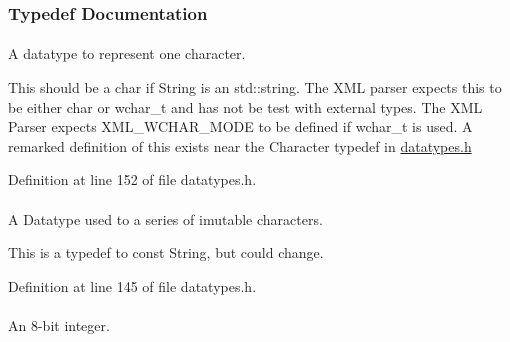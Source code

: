 \subsubsection{Typedef Documentation}
\hypertarget{namespaceMezzanine_ad5147a419db7627ee552a2b582f1052d}{
\paragraph[{Character}]{}\hfill}
\label{namespaceMezzanine_ad5147a419db7627ee552a2b582f1052d}


A datatype to represent one character. 

This should be a char if String is an std::string. The XML parser expects this to be either char or wchar\_\-t and has not be test with external types. The XML Parser expects XML\_\-WCHAR\_\-MODE to be defined if wchar\_\-t is used. A remarked definition of this exists near the Character typedef in \hyperlink{datatypes_8h_source}{datatypes.h} 

Definition at line 152 of file datatypes.h.

\hypertarget{namespaceMezzanine_a63cd699ac54b73953f35ec9cfc05e506}{
\paragraph[{ConstString}]{}\hfill}
\label{namespaceMezzanine_a63cd699ac54b73953f35ec9cfc05e506}


A Datatype used to a series of imutable characters. 

This is a typedef to const String, but could change. 

Definition at line 145 of file datatypes.h.

\hypertarget{namespaceMezzanine_acbb048ee99aa07566d5a6eb33f5a2c2d}{
\paragraph[{Int8}]{}\hfill}
\label{namespaceMezzanine_acbb048ee99aa07566d5a6eb33f5a2c2d}


An 8-\/bit integer. 

